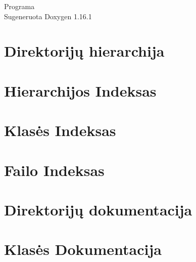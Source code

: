 \documentclass[twoside]{book}
\newcommand{\+}{\discretionary{\mbox{\scriptsize$\hookleftarrow$}}{}{}}
\newcommand{\clearemptydoublepage}{%
    \newpage{\pagestyle{empty}\cleardoublepage}%
  }
\begin{document}
  \raggedbottom
    \hypersetup{pageanchor=false,
                bookmarksnumbered=true,
                pdfencoding=unicode
               }
  \begin{titlepage}
  \vspace*{7cm}
  \begin{center}%
  {\Large Programa}\\
  \vspace*{1cm}
  {\large Sugeneruota Doxygen 1.16.1}\\
  \end{center}
  \end{titlepage}
  \clearemptydoublepage
  \tableofcontents
  \clearemptydoublepage
  \hypersetup{pageanchor=true}
\chapter{Direktorijų hierarchija}

\chapter{Hierarchijos Indeksas}

\chapter{Klasės Indeksas}

\chapter{Failo Indeksas}

\chapter{Direktorijų dokumentacija}

\chapter{Klasės Dokumentacija}




\end{document}
